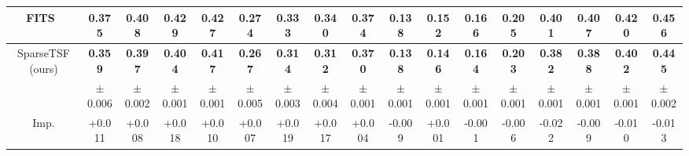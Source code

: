 \begin{table}[!htb]
\begin{adjustbox}{max width=\linewidth}
\begin{tabular}{@{}c|cccc|cccc|cccc|cccc@{}}
FITS~\citeyearpar{fits} & 0.375 & 0.408 & 0.429 & \textbf{0.427} & \textbf{0.274} & \textbf{0.333} & 0.340 & \textbf{0.374} & \textbf{0.138} & 0.152 & 0.166 & 0.205 & 0.401 & 0.407 & 0.420 & 0.456 \\ \midrule
\multirow{2}{*}{SparseTSF (ours)} & \textbf{0.359} & \textbf{0.397} & \textbf{0.404} & \textbf{0.417} & \textbf{0.267} & \textbf{0.314} & \textbf{0.312} & \textbf{0.370} & \textbf{0.138} & \textbf{0.146} & \textbf{0.164} & \textbf{0.203} & \textbf{0.382} & \textbf{0.388} & \textbf{0.402} & \textbf{0.445} \\
 & $\pm$0.006 & $\pm$0.002 & $\pm$0.001 & $\pm$0.001 & $\pm$0.005 & $\pm$0.003 & $\pm$0.004 & $\pm$0.001 & $\pm$0.001 & $\pm$0.001 & $\pm$0.001 & $\pm$0.001 & $\pm$0.001 & $\pm$0.001 & $\pm$0.001 & $\pm$0.002 \\ \midrule
Imp. & +0.011 & +0.008 & +0.018 & +0.010 & +0.007 & +0.019 & +0.017 & +0.004 & -0.009 & +0.001 & -0.001 & -0.006 & -0.022 & -0.009 & -0.010 & -0.013 \\ \bottomrule
\end{tabular}
\end{adjustbox}
\end{table}